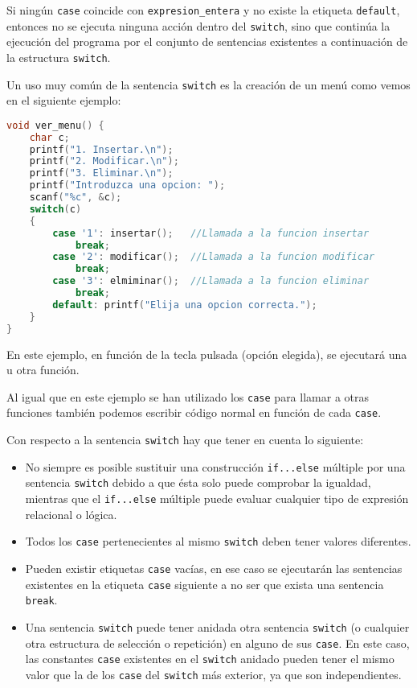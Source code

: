 {Si ningún \texttt{case} coincide con \texttt{expresion\_entera} y no existe la etiqueta \texttt{default}, entonces no se ejecuta ninguna acción dentro del \texttt{switch}, sino que continúa la ejecución del programa por el conjunto de sentencias existentes a continuación de la estructura \texttt{switch}.

Un uso muy común de la sentencia \texttt{switch} es la creación de un menú como vemos en el siguiente ejemplo:
\begin{Ejemplo}
\begin{lstlisting}[language=C]
void ver_menu() {
    char c;
    printf("1. Insertar.\n");
    printf("2. Modificar.\n");
    printf("3. Eliminar.\n");
    printf("Introduzca una opcion: ");
    scanf("%c", &c);
    switch(c)
    {
        case '1': insertar();	//Llamada a la funcion insertar
            break;
        case '2': modificar();	//Llamada a la funcion modificar
            break;
        case '3': elmiminar();	//Llamada a la funcion eliminar
            break;
        default: printf("Elija una opcion correcta.");
    }
}
\end{lstlisting}
\Explicacion
En este ejemplo, en función de la tecla pulsada (opción elegida), se ejecutará una u otra función.

Al igual que en este ejemplo se han utilizado los \texttt{case} para llamar a otras funciones también podemos escribir código normal en función de cada \texttt{case}.\\

\end{Ejemplo}
Con respecto a la sentencia \texttt{switch} hay que tener en cuenta lo siguiente:
\begin{itemize}
	\item No siempre es posible sustituir una construcción \texttt{if...else} múltiple por una sentencia \texttt{switch} debido a que ésta solo puede comprobar la igualdad, mientras que el \texttt{if...else} múltiple puede evaluar cualquier tipo de expresión relacional o lógica.
	\item Todos los \texttt{case} pertenecientes al mismo \texttt{switch} deben tener valores diferentes.
	\item Pueden existir etiquetas \texttt{case} vacías, en ese caso se ejecutarán las sentencias existentes en la etiqueta \texttt{case} siguiente a no ser que exista una sentencia \texttt{break}.
	\item Una sentencia \texttt{switch} puede tener anidada otra sentencia \texttt{switch} (o cualquier otra estructura de selección o repetición) en alguno de sus \texttt{case}. En este caso, las constantes \texttt{case} existentes en el \texttt{switch} anidado pueden tener el mismo valor que la de los \texttt{case} del \texttt{switch} más exterior, ya que son independientes.
\end{itemize}
}

